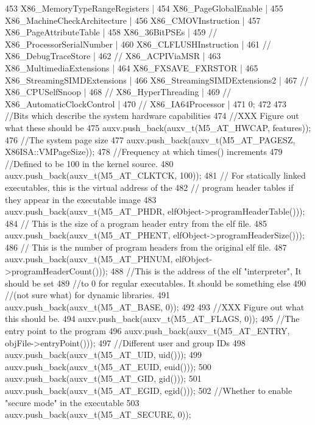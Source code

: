 \begin{DoxyCode}
{{453             X86_MemoryTypeRangeRegisters |
454             X86_PageGlobalEnable |
455             X86_MachineCheckArchitecture |
456             X86_CMOVInstruction |
457             X86_PageAttributeTable |
458             X86_36BitPSEs |
459 //            X86_ProcessorSerialNumber |
460             X86_CLFLUSHInstruction |
461 //            X86_DebugTraceStore |
462 //            X86_ACPIViaMSR |
463             X86_MultimediaExtensions |
464             X86_FXSAVE_FXRSTOR |
465             X86_StreamingSIMDExtensions |
466             X86_StreamingSIMDExtensions2 |
467 //            X86_CPUSelfSnoop |
468 //            X86_HyperThreading |
469 //            X86_AutomaticClockControl |
470 //            X86_IA64Processor |
471             0;
472 
473         //Bits which describe the system hardware capabilities
474         //XXX Figure out what these should be
475         auxv.push_back(auxv_t(M5_AT_HWCAP, features));
476         //The system page size
477         auxv.push_back(auxv_t(M5_AT_PAGESZ, X86ISA::VMPageSize));
478         //Frequency at which times() increments
479         //Defined to be 100 in the kernel source.
480         auxv.push_back(auxv_t(M5_AT_CLKTCK, 100));
481         // For statically linked executables, this is the virtual address of the
482         // program header tables if they appear in the executable image
483         auxv.push_back(auxv_t(M5_AT_PHDR, elfObject->programHeaderTable()));
484         // This is the size of a program header entry from the elf file.
485         auxv.push_back(auxv_t(M5_AT_PHENT, elfObject->programHeaderSize()));
486         // This is the number of program headers from the original elf file.
487         auxv.push_back(auxv_t(M5_AT_PHNUM, elfObject->programHeaderCount()));
488         //This is the address of the elf "interpreter", It should be set
489         //to 0 for regular executables. It should be something else
490         //(not sure what) for dynamic libraries.
491         auxv.push_back(auxv_t(M5_AT_BASE, 0));
492 
493         //XXX Figure out what this should be.
494         auxv.push_back(auxv_t(M5_AT_FLAGS, 0));
495         //The entry point to the program
496         auxv.push_back(auxv_t(M5_AT_ENTRY, objFile->entryPoint()));
497         //Different user and group IDs
498         auxv.push_back(auxv_t(M5_AT_UID, uid()));
499         auxv.push_back(auxv_t(M5_AT_EUID, euid()));
500         auxv.push_back(auxv_t(M5_AT_GID, gid()));
501         auxv.push_back(auxv_t(M5_AT_EGID, egid()));
502         //Whether to enable "secure mode" in the executable
503         auxv.push_back(auxv_t(M5_AT_SECURE, 0));
}}
\end{DoxyCode}
